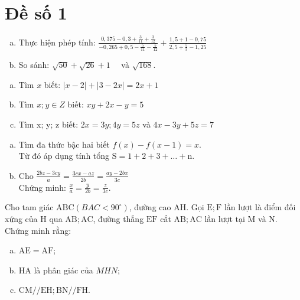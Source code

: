 \section{Đề số 1}

\begin{bt}
    
    \begin{enumerate}[a.]
        \item Thực hiện phép tính: $\frac{0,375-0,3+\frac{3}{11}+\frac{3}{12}}{-0,265+0,5-\frac{5}{11}-\frac{5}{12}}+\frac{1,5+1-0,75}{2,5+\frac{5}{3}-1,25}$
        \item So sánh: $\sqrt{50}+\sqrt{26}+1 \quad$ và $\sqrt{168}$.
    \end{enumerate}
\loigiai{} 
\end{bt}

\begin{bt}
    \begin{enumerate}[a.]
        \item Tìm $x$ biết: $|x-2|+|3-2 x|=2 x+1$
        \item Tìm $x ; y \in Z$ biết: $x y+2 x-y=5$
        \item Tìm x; y; z biết: $2 x=3 y ; 4 y=5 z$ và $4 x-3 y+5 z=7$
    \end{enumerate}
\loigiai{} 
\end{bt}

\begin{bt}
    \begin{enumerate}[a.]
        \item Tìm đa thức bậc hai biết $f(x)-f(x-1)=x$.\\Từ đó áp dụng tính tổng $\mathrm{S}=1+2+3+\ldots+\mathrm{n}$.
        \item Cho $\frac{2 b z-3 c y}{a}=\frac{3 c x-a z}{2 b}=\frac{a y-2 b x}{3 c}$\\Chứng minh: $\frac{x}{a}=\frac{y}{2 b}=\frac{z}{3 c}$.
    \end{enumerate}
\loigiai{} 
\end{bt}

\begin{bt}
    Cho tam giác $\mathrm{ABC}\left(B A C<90^{\circ}\right)$, đường cao $\mathrm{AH}$. Gọi $\mathrm{E} ; \mathrm{F}$ lần lượt là điểm đối xứng của $\mathrm{H}$ qua $\mathrm{AB} ; \mathrm{AC}$, đường thẳng $\mathrm{EF}$ cắt $\mathrm{AB} ; \mathrm{AC}$ lần lượt tại $\mathrm{M}$ và $\mathrm{N}$. Chứng minh rằng:
    \begin{enumerate}[a.]
    \item $\mathrm{AE}=\mathrm{AF}$;
    \item HA là phân giác của $M H N$;
    \item $\mathrm{CM} / / \mathrm{EH} ; \mathrm{BN} / / \mathrm{FH}$.
    \end{enumerate}
\loigiai{}
\end{bt}